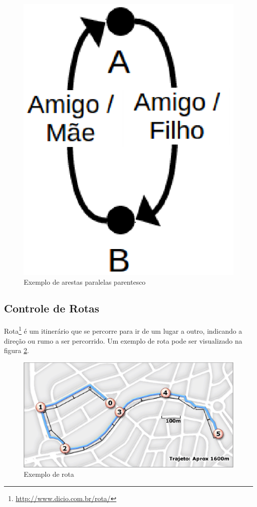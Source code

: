\begin{figure}[!h]
	\centering
	\includegraphics[scale=0.45]{figuras/capitulo5/parentes.eps}
	\caption{Exemplo de arestas paralelas parentesco}
	\label{parentes}
\end{figure}

\subsection{Controle de Rotas}

Rota\footnote{\url{http://www.dicio.com.br/rota/}} é um itinerário que se percorre para ir de um lugar a outro, indicando a direção ou rumo a ser percorrido. Um exemplo de rota pode ser visualizado na figura \ref{rota}.

\begin{figure}[!h]
	\centering
	\includegraphics[scale=0.55]{figuras/capitulo5/rota.eps}
	\caption[Exemplo de rota]{Exemplo de rota\footnotemark}
	\label{rota}
\end{figure}

